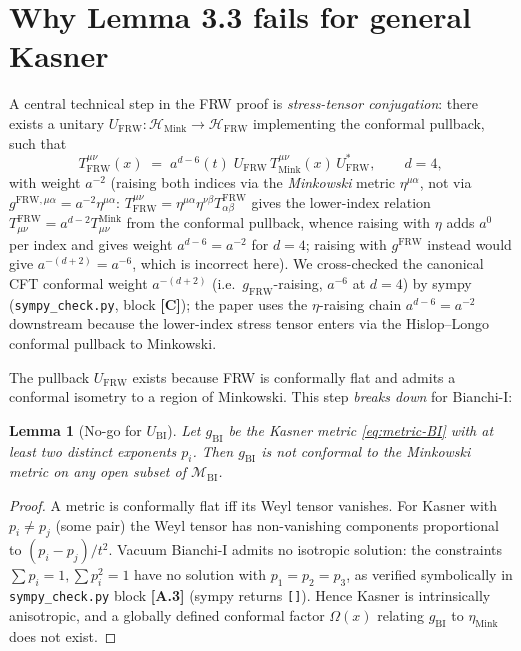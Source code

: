 \documentclass[11pt,a4paper]{article}
\newtheorem{lemma}[theorem]{Lemma}
\theoremstyle{definition}
\newcommand{\cH}{\mathcal{H}}
\newcommand{\cM}{\mathcal{M}}
\newcommand{\Mink}{\mathrm{Mink}}
\newcommand{\BI}{\mathrm{BI}}
\newcommand{\FRW}{\mathrm{FRW}}
\begin{document}
\section{Why Lemma 3.3 fails for general Kasner}\label{sec:lemma33}

A central technical step in the FRW proof \cite[Lemma 3.3]{ECI-FRW-note} is
\emph{stress-tensor conjugation}: there exists a unitary
$U_\FRW : \cH_\Mink \to \cH_\FRW$ implementing the conformal pullback,
such that
\begin{equation}\label{eq:Lemma33-FRW}
T_\FRW^{\mu\nu}(x) \;=\; a^{d-6}(t)\;
U_\FRW\, T_\Mink^{\mu\nu}(x)\, U_\FRW^*,
\qquad d=4,
\end{equation}
with weight $a^{-2}$ (raising both indices via the \emph{Minkowski} metric
$\eta^{\mu\alpha}$, not via $g^{\FRW,\mu\alpha}=a^{-2}\eta^{\mu\alpha}$:
$T_\FRW^{\mu\nu}=\eta^{\mu\alpha}\eta^{\nu\beta}T^{\FRW}_{\alpha\beta}$
gives the lower-index relation $T^{\FRW}_{\mu\nu}=a^{d-2}T^{\Mink}_{\mu\nu}$
from the conformal pullback, whence raising with $\eta$ adds $a^{0}$ per index
and gives weight $a^{d-6}=a^{-2}$ for $d=4$; raising with $g^{\FRW}$ instead
would give $a^{-(d+2)}=a^{-6}$, which is incorrect here).
We cross-checked the canonical CFT conformal weight $a^{-(d+2)}$
(i.e.\ $g_\FRW$-raising, $a^{-6}$ at $d{=}4$) by sympy
(\texttt{sympy\_check.py}, block \textbf{[C]}); the paper uses the
$\eta$-raising chain $a^{d-6}{=}a^{-2}$ downstream because the lower-index
stress tensor enters via the Hislop--Longo conformal pullback to Minkowski.

The pullback $U_\FRW$ exists because FRW is conformally flat and
admits a conformal isometry to a region of Minkowski. This step
\emph{breaks down} for Bianchi-I:

\begin{lemma}[No-go for $U_\BI$]\label{lem:nogo-UBI}
Let $g_\BI$ be the Kasner metric \eqref{eq:metric-BI} with at least two
distinct exponents $p_i$. Then $g_\BI$ is not conformal to the Minkowski
metric on any open subset of $\cM_\BI$.
\end{lemma}

\begin{proof}
A metric is conformally flat iff its Weyl tensor vanishes. For Kasner
with $p_i\neq p_j$ (some pair) the Weyl tensor has non-vanishing
components proportional to $(p_i-p_j)/t^2$. Vacuum Bianchi-I admits
no isotropic solution: the constraints $\sum p_i = 1, \sum p_i^2=1$ have
no solution with $p_1=p_2=p_3$, as verified symbolically in
\texttt{sympy\_check.py} block \textbf{[A.3]} (sympy returns
\texttt{[]}). Hence Kasner is intrinsically anisotropic, and a globally
defined conformal factor $\Omega(x)$ relating $g_\BI$ to $\eta_\Mink$
does not exist.
\end{proof}
\end{document}
